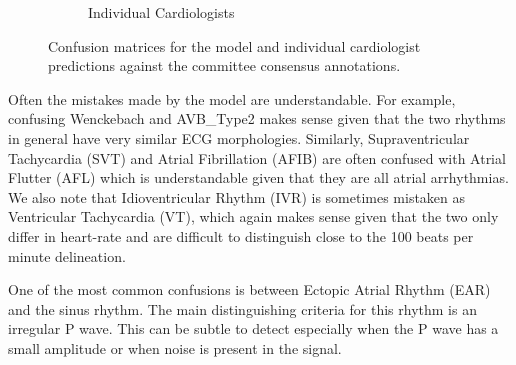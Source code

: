 \begin{figure}
\begin{subfigure}{.5\textwidth}
  \caption{Individual Cardiologists}
  \label{fig:arrhythmia:human_confusion}
\end{subfigure}
\caption{Confusion matrices for the model and individual cardiologist
         predictions against the committee consensus annotations.}
\end{figure}

Often the mistakes made by the model are understandable. For example, confusing
Wenckebach and AVB\_Type2 makes sense given that the two rhythms in general
have very similar ECG morphologies. Similarly, Supraventricular Tachycardia
(SVT) and Atrial Fibrillation (AFIB) are often confused with Atrial Flutter
(AFL) which is understandable given that they are all atrial arrhythmias. We
also note that Idioventricular Rhythm (IVR) is sometimes mistaken as
Ventricular Tachycardia (VT), which again makes sense given that the two only
differ in heart-rate and are difficult to distinguish close to the 100 beats
per minute delineation.

One of the most common confusions is between Ectopic Atrial Rhythm (EAR) and
the sinus rhythm. The main distinguishing criteria for this rhythm is an
irregular P wave. This can be subtle to detect especially when the P wave has a
small amplitude or when noise is present in the signal.
